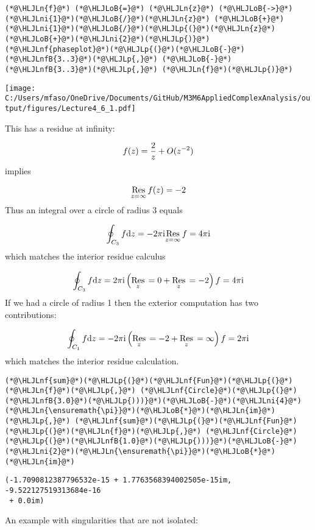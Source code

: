 \documentclass[12pt,a4paper]{article}
\newcommand{\HLJLn}[1]{#1}
\newcommand{\HLJLnf}[1]{\textcolor[RGB]{66,102,213}{#1}}
\newcommand{\HLJLnfB}[1]{\textcolor[RGB]{59,151,46}{#1}}
\newcommand{\HLJLni}[1]{\textcolor[RGB]{59,151,46}{#1}}
\newcommand{\HLJLoB}[1]{\textcolor[RGB]{102,102,102}{\textbf{#1}}}
\newcommand{\HLJLp}[1]{#1}
\def\D{ {\rm d} }
\def\I{ {\rm i} }
\def\Res_#1{\underset{#1}{\rm Res}\,}
\def\pr(#1){\left({#1}\right)}
\begin{document}
\begin{lstlisting}
(*@\HLJLn{f}@*) (*@\HLJLoB{=}@*) (*@\HLJLn{z}@*) (*@\HLJLoB{->}@*) (*@\HLJLni{1}@*)(*@\HLJLoB{/}@*)(*@\HLJLn{z}@*) (*@\HLJLoB{+}@*) (*@\HLJLni{1}@*)(*@\HLJLoB{/}@*)(*@\HLJLp{(}@*)(*@\HLJLn{z}@*)(*@\HLJLoB{+}@*)(*@\HLJLni{2}@*)(*@\HLJLp{)}@*)
(*@\HLJLnf{phaseplot}@*)(*@\HLJLp{(}@*)(*@\HLJLoB{-}@*)(*@\HLJLnfB{3..3}@*)(*@\HLJLp{,}@*) (*@\HLJLoB{-}@*)(*@\HLJLnfB{3..3}@*)(*@\HLJLp{,}@*) (*@\HLJLn{f}@*)(*@\HLJLp{)}@*)
\end{lstlisting}

\texttt{[image: C:/Users/mfaso/OneDrive/Documents/GitHub/M3M6AppliedComplexAnalysis/output/figures/Lecture4\_6\_1.pdf]}

This has a residue at infinity:

\[
f(z) = {2 \over z} + O(z^{-2})
\]
implies

\[
\Res_{z = \infty} f(z) = -2
\]
Thus an integral over a circle of radius 3 equals

\[
\oint_{C_3} f \D z = -2 \pi \I \Res_{z = \infty} f = 4\pi \I
\]
which matches the interior residue calculus

\[
\oint_{C_3} f \D z =  2 \pi \I \pr(\Res_{z = 0} + \Res_{z = -2}) f = 4 \pi \I
\]
If we had a circle of radius 1 then the exterior computation has two contributions:

\[
\oint_{C_1} f \D z =  -2 \pi \I \pr(\Res_{z = -2} + \Res_{z = \infty}) f = 2\pi \I
\]
which matches the interior residue calculation.


\begin{lstlisting}
(*@\HLJLnf{sum}@*)(*@\HLJLp{(}@*)(*@\HLJLnf{Fun}@*)(*@\HLJLp{(}@*)(*@\HLJLn{f}@*)(*@\HLJLp{,}@*) (*@\HLJLnf{Circle}@*)(*@\HLJLp{(}@*)(*@\HLJLnfB{3.0}@*)(*@\HLJLp{)))}@*)(*@\HLJLoB{-}@*)(*@\HLJLni{4}@*)(*@\HLJLn{\ensuremath{\pi}}@*)(*@\HLJLoB{*}@*)(*@\HLJLn{im}@*)(*@\HLJLp{,}@*) (*@\HLJLnf{sum}@*)(*@\HLJLp{(}@*)(*@\HLJLnf{Fun}@*)(*@\HLJLp{(}@*)(*@\HLJLn{f}@*)(*@\HLJLp{,}@*) (*@\HLJLnf{Circle}@*)(*@\HLJLp{(}@*)(*@\HLJLnfB{1.0}@*)(*@\HLJLp{)))}@*)(*@\HLJLoB{-}@*)(*@\HLJLni{2}@*)(*@\HLJLn{\ensuremath{\pi}}@*)(*@\HLJLoB{*}@*)(*@\HLJLn{im}@*)
\end{lstlisting}

\begin{lstlisting}
(-1.7090812387796532e-15 + 1.7763568394002505e-15im, -9.522127519313684e-16
 + 0.0im)
\end{lstlisting}


An example with singularities that are not isolated:
\end{document}
